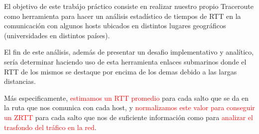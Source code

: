 El objetivo de este trab\'ajo pr\'actico consiste en realizar nuestro propio 
Traceroute como herramienta para hacer un an\'alisis estad\'istico de tiempos
de RTT en la comunicaci\'on con algunos hosts ubicados en distintos lugares
geográficos (universidades en distintos pa\'ises).

El fin de este análisis, además de presentar un desafio implementativo y analítico, sería determinar haciendo uso de esta herramienta enlaces submarinos donde el RTT de los mismos se destaque por encima de los demas debido a las largas distancias.

Más especificamente, \textcolor{red}{estimamos un RTT promedio} para cada salto que se da en 
la ruta que nos comunica con cada host, y \textcolor{red}{normalizamos este valor para 
conseguir un ZRTT} para cada salto que nos de suficiente informaci\'on como para
\textcolor{red}{analizar el trasfondo del tr\'afico en la red}.



